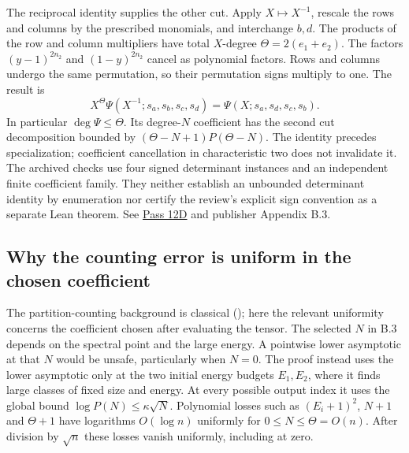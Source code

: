 \documentclass[11pt,letterpaper]{article}
\theoremstyle{definition}\newtheorem{definition}[theorem]{Definition}\newtheorem{example}[theorem]{Example}
\theoremstyle{remark}\newtheorem{remark}[theorem]{Remark}
\newcommand{\aud}[2]{\href{https://github.com/nousentllc/VP-VNP-Review/blob/567303d0bcf4f9d54390437b137752446e58ccd6/#1}{#2}}
\begin{document}
The reciprocal identity supplies the other cut. Apply $X\mapsto X^{-1}$, rescale the rows and columns by the prescribed monomials, and interchange $b,d$. The products of the row and column multipliers have total $X$-degree $\Theta=2(e_1+e_2)$. The factors $(y-1)^{2n_2}$ and $(1-y)^{2n_2}$ cancel as polynomial factors. Rows and columns undergo the same permutation, so their permutation signs multiply to one. The result is
\[
 X^\Theta\Psi(X^{-1};s_a,s_b,s_c,s_d)
       =\Psi(X;s_a,s_d,s_c,s_b).
\]
In particular $\deg\Psi\le\Theta$. Its degree-$N$ coefficient has the second cut decomposition bounded by $(\Theta-N+1)P(\Theta-N)$. The identity precedes specialization; coefficient cancellation in characteristic two does not invalidate it. The archived checks use four signed determinant instances and an independent finite coefficient family. They neither establish an unbounded determinant identity by enumeration nor certify the review's explicit sign convention as a separate Lean theorem. See \aud{passes/12d-counting-and-minors.md}{Pass 12D} and publisher Appendix B.3.

\subsection{Why the counting error is uniform in the chosen coefficient}
The partition-counting background is classical (\cite{andrews,hardyRamanujan}); here the relevant uniformity concerns the coefficient chosen after evaluating the tensor.
The selected $N$ in B.3 depends on the spectral point and the large energy. A pointwise lower asymptotic at that $N$ would be unsafe, particularly when $N=0$. The proof instead uses the lower asymptotic only at the two initial energy budgets $E_1,E_2$, where it finds large classes of fixed size and energy. At every possible output index it uses the global bound $\log P(N)\le\kappa\sqrt N$. Polynomial losses such as $(E_i+1)^2$, $N+1$ and $\Theta+1$ have logarithms $O(\log n)$ uniformly for $0\le N\le\Theta=O(n)$. After division by $\sqrt n$ these losses vanish uniformly, including at zero.
\end{document}
